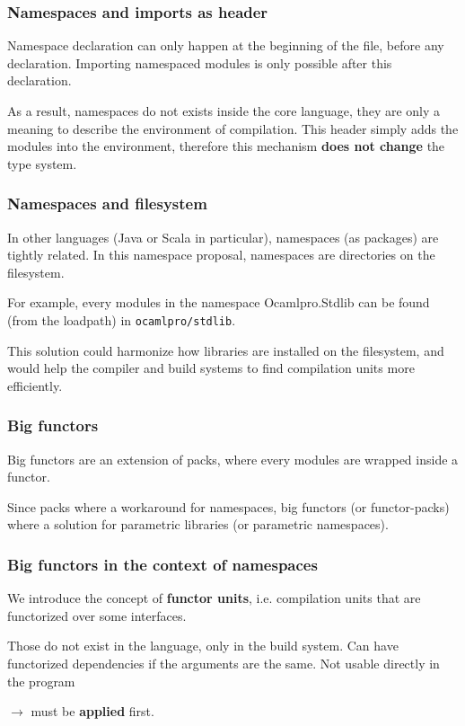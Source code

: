 \documentclass{beamer}
\begin{document}
\begin{frame}
\frametitle{Namespaces and imports as header}

Namespace declaration can only happen at the beginning of the file, before any
declaration. Importing namespaced modules is only possible after this
declaration.

\medskip

As a result, namespaces do not exists inside the core language, they are only a
meaning to describe the environment of compilation. This header simply adds the
modules into the environment, therefore this mechanism \textbf{does not change}
the type system.

\end{frame}

\begin{frame}[fragile]
\frametitle{Namespaces and filesystem}
In other languages (Java or Scala in particular), namespaces (as packages) are
tightly related. In this namespace proposal, namespaces are directories on the
filesystem.

\medskip

For example, every modules in the namespace Ocamlpro.Stdlib can be found (from
the loadpath) in \texttt{ocamlpro/stdlib}.

\medskip

This solution could harmonize how libraries are installed on the filesystem, and
would help the compiler and build systems to find compilation units more efficiently.

\end{frame}

\begin{frame}
\frametitle{Big functors}

Big functors are an extension of packs, where every modules are wrapped inside a
functor. 

\medskip

Since packs where a workaround for namespaces, big functors (or functor-packs)
where a solution for parametric libraries (or parametric namespaces).

\end{frame}

\begin{frame}
\frametitle{Big functors in the context of namespaces}

We introduce the concept of \textbf{functor units}, i.e. compilation units that
are functorized over some interfaces. 

\medskip

Those do not exist in the language, only in the build system. Can have
functorized dependencies if the arguments are the same. Not usable directly in
the program 

$\rightarrow$ must be \textbf{applied} first.

\end{frame}
\end{document}

